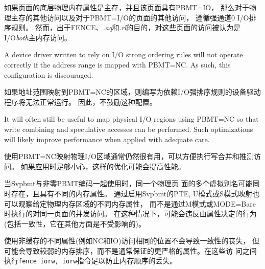 如果页面的底层物理内存属性是主存，并且该页面具有PBMT=IO，
那么对于物理主存的其他访问以及对于PBMT=I/O的页面的其他访问，
遵循强通道0 I/O排序规则。
然而，出于FENCE、{\em.aq}和{\em.rl}的目的，对这些页面的访问被认为是I/O{\em both}主内存访问。

\begin{commentary}
A device driver written to rely on I/O strong ordering rules will not
operate correctly if the address range is mapped with PBMT=NC.
As such, this configuration is discouraged.

如果地址范围映射到PBMT=NC的区域，则编写为依赖I/O强排序规则的设备驱动程序将无法正常运行。
因此，不鼓励这种配置。

It will often still be useful to map physical I/O regions using PBMT=NC so that
write combining and speculative accesses can be performed.  Such optimizations
will likely improve performance when applied with adequate care.

使用PBMT=NC映射物理I/O区域通常仍然很有用，可以方便执行写合并和推测访问。
如果应用时足够小心，这样的优化可能会提高性能。
\end{commentary}

当Svpbmt与非零PBMT编码一起使用时，同一个物理页
面的多个虚拟别名可能同时存在，且具有不同的内存属性。
通过启用Svpbmt的PTE, U模式或S模式映射也可以观察给定物理内存区域的不同内存属性，
而不是通过M模式或MODE=Bare时执行的对同一页面的并发访问。
在这种情况下，可能会违反由属性决定的行为(包括一致性，它在其他方面是不受影响的)。

使用非缓存的不同属性(例如NC和IO)访问相同的位置不会导致一致性的丧失，
但可能会导致较弱的内存排序，而不是通常保证的更严格的属性。在这些访
问之间执行{\tt fence iorw, iorw}指令足以防止内存顺序的丢失。

